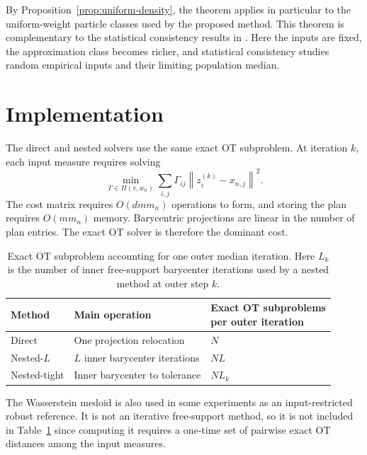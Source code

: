 \documentclass[pdflatex,sn-mathphys-ay]{sn-jnl}%
\theoremstyle{thmstyleone}%
\theoremstyle{thmstyletwo}%
\theoremstyle{thmstylethree}%
\newcommand{\norm}[1]{\left\lVert #1\right\rVert}
\begin{document}
By Proposition~\ref{prop:uniform-density}, the theorem applies in particular to the uniform-weight particle classes used by the proposed method. This theorem is complementary to the statistical consistency results in \citet{you_2025_WassersteinMedianProbability}. Here the inputs are fixed, the approximation class becomes richer, and statistical consistency studies random empirical inputs and their limiting population median.






\section{Implementation}\label{sec:implementation}

The direct and nested solvers use the same exact OT subproblem. At iteration \(k\), each input measure requires solving
\[
    \min_{\Gamma\in\Pi(v,w_n)}\sum_{i,j}\Gamma_{ij}\norm{z_i^{(k)}-x_{n,j}}^2.
\]
The cost matrix requires \(O(d m m_n)\) operations to form, and storing the plan requires \(O(m m_n)\) memory. Barycentric projections are linear in the number of plan entries. The exact OT solver is therefore the dominant cost.

\begin{table}[ht]
\centering
\caption{Exact OT subproblem accounting for one outer median iteration. Here \(L_k\) is the number of inner free-support barycenter iterations used by a nested method at outer step \(k\).}
\label{tab:cost}
\begin{tabular}{lll}
\toprule
Method & Main operation & \makecell{Exact OT subproblems \\per outer iteration} \\
\midrule
Direct & One projection relocation & \(N\) \\
Nested-\(L\) & \(L\) inner barycenter iterations & \(N L\) \\
Nested-tight & Inner barycenter to tolerance & \(N L_k\) \\
\bottomrule
\end{tabular}
\end{table}

The Wasserstein medoid is also used in some experiments as an input-restricted robust reference. It is not an iterative free-support method, so it is not included in Table~\ref{tab:cost} since computing it requires a one-time set of pairwise exact OT distances among the input measures.
\end{document}
